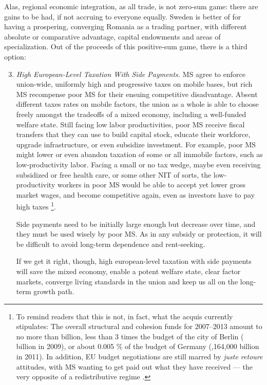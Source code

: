 \documentclass[11pt,a4paper,oneside,openright]{article}
\begin{document}
Alas, regional economic integration, as all trade, is not zero-sum game: 
there are gains to be had, if not accruing to everyone equally. 
Sweden is better of for having a prospering, converging Romania as a trading partner, with different absolute or comparative advantage, capital endowments and areas of specialization. 
Out of the proceeds of this positive-sum game, there is a third option:
\begin{enumerate}
	\setcounter{enumi}{2}
	\item \emph{High European-Level Taxation With Side Payments.} \gls{MS} agree to enforce union-wide, uniformly high and progressive taxes on mobile bases, but rich \gls{MS} recompense poor \gls{MS} for their ensuing competitive disadvantage. 
	Absent different taxes rates on mobile factors, the union as a whole is able to choose freely amongst the tradeoffs of a mixed economy, including a well-funded welfare state. 
	Still facing low labor productivities, poor \gls{MS} receive fiscal transfers that they can use to build capital stock, educate their workforce, upgrade infrastructure, or even subsidize investment. 
	For example, poor \gls{MS} might lower or even abandon taxation of some or all immobile factors, such as low-productivity labor. 
	Facing a small or no tax wedge, maybe even receiving subsidized or free health care, or some other \gls{NIT} of sorts, the low-productivity workers in poor \gls{MS} would be able to accept yet lower gross market wages, and become competitive again, even as investors have to pay high taxes
	\footnote{
		To remind readers that this is not, in fact, what the acquis currently stipulates: 
		The overall structural and cohesion funds for 2007--2013 amount to no more than  billion, less than 3 times the budget of the city of Berlin ( billion in 2009), or about 0.005 \% of the budget of Germany (,164,000 billion in 2011). 
		In addition, \gls{EU} budget negotiations are still marred by \emph{juste retoure} attitudes, with \gls{MS} wanting to get paid out what they have received --- the very opposite of a redistributive regime \citep[e.g.][]{Begg2008a}.
	}.
	
	Side payments need to be initially large enough but decrease over time, and they must be used wisely by poor \gls{MS}. 
	As in any subsidy or  protection, it will be difficult to avoid long-term dependence and rent-seeking.
	
	If we get it right, though, high european-level taxation with side payments will save the mixed economy, enable a potent welfare state, clear factor markets, converge living standards in the union and keep us all on the long-term growth path. 
\end{enumerate}
\end{document}
